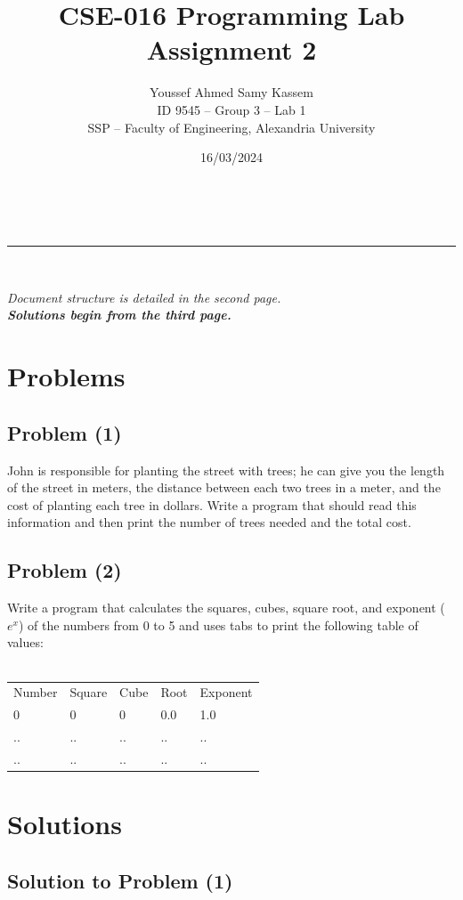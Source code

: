 \documentclass[a4paper,11pt]{article}
\makeatletter
\newcommand{\linia}{\rule{\linewidth}{0.5pt}}
\theoremstyle{mytheor}
\theoremstyle{mytheor}
\renewcommand{\maketitle}{
\begin{center}
\vspace{2ex}
{\huge \textsf{\textbf{\@title}}}
\vspace{1ex}
\\
\linia\\
\textsf{\@date \hfill
\@author}
\vspace{4ex}
\end{center}
}
\makeatother
\begin{document}
\title{CSE-016 Programming Lab Assignment \textnumero{} 2}

\date{16/03/2024}

\author{Youssef Ahmed Samy Kassem\\ \hfill ID 9545 -- Group 3 -- Lab 1\\ \hfill SSP -- Faculty of Engineering, Alexandria University\\}

\maketitle
\textsf{\textsl{Document structure is detailed in the second page.\\\textbf{Solutions begin from the third page.}}}
\section{Problems}
\subsection{Problem (1)}
John is responsible for planting the street with trees; he can give you the length of the street in
meters, the distance between each two trees in a meter, and the cost of planting each tree in
dollars. Write a program that should read this information and then print the number of trees
needed and the total cost.
\subsection{Problem (2)}
Write a program that calculates the squares, cubes, square root, and exponent ($e^{x}$) of the
numbers from 0 to 5 and uses tabs to print the following table of values:\\\\
\setlength{\tabcolsep}{18pt}
\begin{tabular}{ l l l l l }
Number & Square & Cube & Root & Exponent \\ 
 0 & 0  & 0 & 0.0 & 1.0 \\  
 .. & .. & .. & .. & .. \\
 .. & .. & .. & .. & ..
\end{tabular}
\newpage
\tableofcontents
\newpage
\section{Solutions}
\subsection{Solution to Problem (1)}
\end{document}
